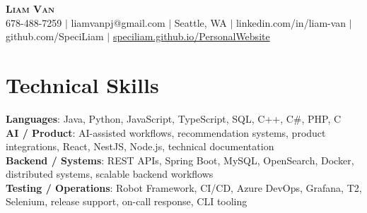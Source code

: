 \documentclass[letterpaper,11pt]{article}
\begin{document}

%
\begin{center}
    \textbf{\Huge \scshape Liam Van} \\ \vspace{1pt}
    \small 678-488-7259 $|$ \small {liamvanpj@gmail.com} $|$ Seattle, WA
 {{$|$ linkedin.com/in/liam-van} {$|$ github.com/SpeciLiam} {$|$ \href{https://speciliam.github.io/PersonalWebsite}{speciliam.github.io/PersonalWebsite}}}

\end{center}

\section{Technical Skills}
 \begin{itemize}[leftmargin=0.15in, label={}]
    \small{\item{
     \textbf{Languages}{: Java, Python, JavaScript, TypeScript, SQL, C++, C\#, PHP, C} \\
     \textbf{AI / Product}{: AI-assisted workflows, recommendation systems, product integrations, React, NestJS, Node.js, technical documentation} \\
     \textbf{Backend / Systems}{: REST APIs, Spring Boot, MySQL, OpenSearch, Docker, distributed systems, scalable backend workflows} \\
     \textbf{Testing / Operations}{: Robot Framework, CI/CD, Azure DevOps, Grafana, T2, Selenium, release support, on-call response, CLI tooling} \\
    }}
 \end{itemize}
%
\end{document}
